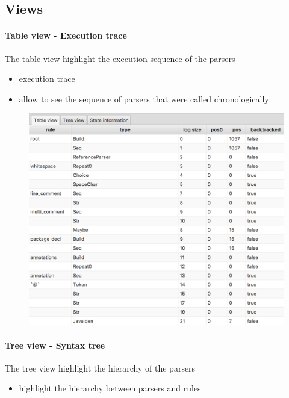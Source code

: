 		\subsection{Views}
		\paragraph{Table view - Execution trace} The table view highlight the execution sequence of the parsers

		\begin{itemize}
			\item execution trace
			\item allow to see the sequence of parsers that were called chronologically
		\end{itemize}

		\begin{figure}[h]
			\centering
			\includegraphics[width=.7\textwidth] {ressources/tableview}
			\caption{} 
			\label{fig:tableview}
		\end{figure}
		\paragraph{Tree view - Syntax tree} The tree view highlight the hierarchy of the parsers

		\begin{itemize}
			\item highlight the hierarchy between parsers and rules
		\end{itemize}


